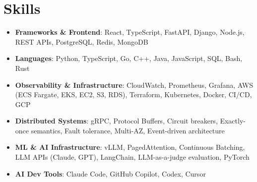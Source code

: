 \documentclass[letterpaper,11pt]{article}
\newcommand{\resumeSubHeadingListStart}{\begin{itemize}[leftmargin=0.15in, label={}]}
\newcommand{\resumeSubHeadingListEnd}{\end{itemize}}
\newcommand{\resumeSkillHeading}[2]{%
  \item\small{\textbf{#1}: #2 \vspace{-9pt}}%
}
\begin{document}
\section{Skills}
  \resumeSubHeadingListStart
    \resumeSkillHeading{Frameworks \& Frontend}{React, TypeScript, FastAPI, Django, Node.js, REST APIs, PostgreSQL, Redis, MongoDB}
    \resumeSkillHeading{Languages}{Python, TypeScript, Go, C++, Java, JavaScript, SQL, Bash, Rust}
    \resumeSkillHeading{Observability \& Infrastructure}{CloudWatch, Prometheus, Grafana, AWS (ECS Fargate, EKS, EC2, S3, RDS), Terraform, Kubernetes, Docker, CI/CD, GCP}
    \resumeSkillHeading{Distributed Systems}{gRPC, Protocol Buffers, Circuit breakers, Exactly-once semantics, Fault tolerance, Multi-AZ, Event-driven architecture}
    \resumeSkillHeading{ML \& AI Infrastructure}{vLLM, PagedAttention, Continuous Batching, LLM APIs (Claude, GPT), LangChain, LLM-as-a-judge evaluation, PyTorch}
    \resumeSkillHeading{AI Dev Tools}{Claude Code, GitHub Copilot, Codex, Cursor}
  \resumeSubHeadingListEnd
\end{document}
